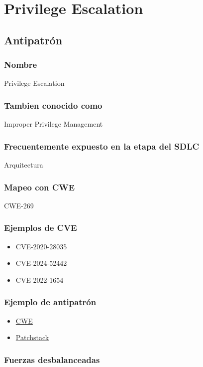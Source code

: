 \chapter{Privilege Escalation}
\section{Antipatrón}
\subsection*{Nombre}
Privilege Escalation
\subsection*{Tambien conocido como}
Improper Privilege Management
\subsection*{Frecuentemente expuesto en la etapa del SDLC}
Arquitectura
\subsection*{Mapeo con CWE}
CWE-269
\subsection*{Ejemplos de CVE}
\begin{itemize}
    \item CVE-2020-28035
    \item CVE-2024-52442
    \item CVE-2022-1654
\end{itemize}
\subsection*{Ejemplo de antipatrón}

\begin{itemize}
    \item \href{https://cwe.mitre.org/data/definitions/269.html}{CWE}
    \item \href{https://patchstack.com/academy/wordpress/vulnerabilities/privilege-escalation/}{Patchstack}
\end{itemize}

\subsection*{Fuerzas desbalanceadas}

